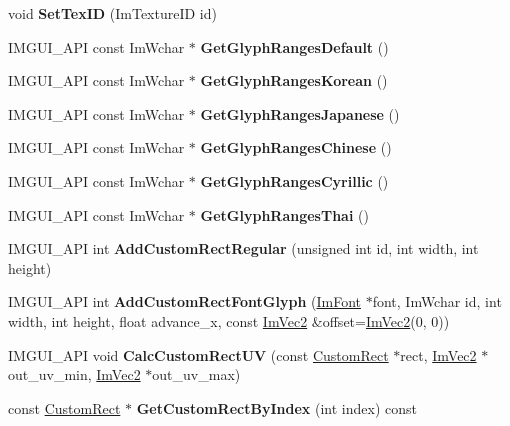 \begin{DoxyCompactItemize}
void {\bfseries Set\+Tex\+ID} (Im\+Texture\+ID id)
\item 
\mbox{\label{struct_im_font_atlas_adec0df140eb1dc01c2a22a5253d62820}} 
I\+M\+G\+U\+I\+\_\+\+A\+PI const Im\+Wchar $\ast$ {\bfseries Get\+Glyph\+Ranges\+Default} ()
\item 
\mbox{\label{struct_im_font_atlas_ac70e07bd35913661c8fc50413b3bf969}} 
I\+M\+G\+U\+I\+\_\+\+A\+PI const Im\+Wchar $\ast$ {\bfseries Get\+Glyph\+Ranges\+Korean} ()
\item 
\mbox{\label{struct_im_font_atlas_a2654afbbf73835bf08278cdc6c181a96}} 
I\+M\+G\+U\+I\+\_\+\+A\+PI const Im\+Wchar $\ast$ {\bfseries Get\+Glyph\+Ranges\+Japanese} ()
\item 
\mbox{\label{struct_im_font_atlas_afc5807dd42b3a644a9a1e0a95c13cb08}} 
I\+M\+G\+U\+I\+\_\+\+A\+PI const Im\+Wchar $\ast$ {\bfseries Get\+Glyph\+Ranges\+Chinese} ()
\item 
\mbox{\label{struct_im_font_atlas_a5aaff3357d9ed401ce451c39942e869e}} 
I\+M\+G\+U\+I\+\_\+\+A\+PI const Im\+Wchar $\ast$ {\bfseries Get\+Glyph\+Ranges\+Cyrillic} ()
\item 
\mbox{\label{struct_im_font_atlas_a4985c51d8a5270ff027f13fa44a14371}} 
I\+M\+G\+U\+I\+\_\+\+A\+PI const Im\+Wchar $\ast$ {\bfseries Get\+Glyph\+Ranges\+Thai} ()
\item 
\mbox{\label{struct_im_font_atlas_ac51952803d2205f28ca9fc996c5f6243}} 
I\+M\+G\+U\+I\+\_\+\+A\+PI int {\bfseries Add\+Custom\+Rect\+Regular} (unsigned int id, int width, int height)
\item 
\mbox{\label{struct_im_font_atlas_a5643182be4e3f1a442cfa6cdc0321c7c}} 
I\+M\+G\+U\+I\+\_\+\+A\+PI int {\bfseries Add\+Custom\+Rect\+Font\+Glyph} (\hyperlink{struct_im_font}{Im\+Font} $\ast$font, Im\+Wchar id, int width, int height, float advance\+\_\+x, const \hyperlink{struct_im_vec2}{Im\+Vec2} \&offset=\hyperlink{struct_im_vec2}{Im\+Vec2}(0, 0))
\item 
\mbox{\label{struct_im_font_atlas_a70e062104b11a213eb3d177151c418e2}} 
I\+M\+G\+U\+I\+\_\+\+A\+PI void {\bfseries Calc\+Custom\+Rect\+UV} (const \hyperlink{struct_im_font_atlas_1_1_custom_rect}{Custom\+Rect} $\ast$rect, \hyperlink{struct_im_vec2}{Im\+Vec2} $\ast$out\+\_\+uv\+\_\+min, \hyperlink{struct_im_vec2}{Im\+Vec2} $\ast$out\+\_\+uv\+\_\+max)
\item 
\mbox{\label{struct_im_font_atlas_a4d4403e920f1d93307936781050b52ee}} 
const \hyperlink{struct_im_font_atlas_1_1_custom_rect}{Custom\+Rect} $\ast$ {\bfseries Get\+Custom\+Rect\+By\+Index} (int index) const
\end{DoxyCompactItemize}
